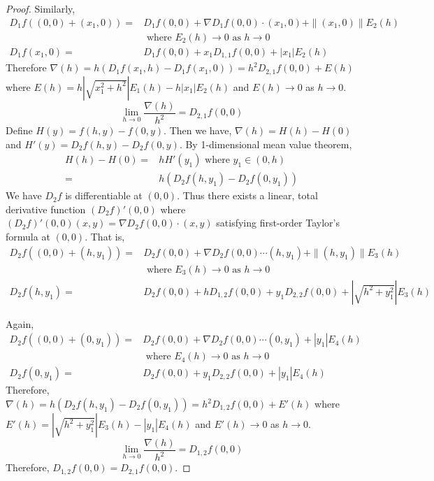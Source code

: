 \begin{proof}
	Similarly,
	\begin{align*}
		D_1 f((0,0) + (x_1,0)) = & D_1 f(0,0) + \nabla D_1 f(0,0) \cdot{} (x_1,0) + \|(x_1,0)\| E_2(h) \\
		& \text{ where } E_2(h) \to 0 \text{ as } h  \to 0 \\
		D_1 f(x_1,0) = & D_1 f(0,0) + x_1 D_{1,1} f(0,0) + |x_1| E_2(h)
	\end{align*}
	Therefore $\nabla(h) = h (D_1 f(x_1,h) - D_1 f(x_1,0)) = h^2 D_{2,1} f(0,0) + E(h)$ where $E(h) = h|\sqrt{x_1^2+h^2}| E_1(h) - h|x_1|E_2(h)$ and $E(h) \to 0$ as $h \to 0$.\\
	\begin{equation}
		\lim_{h \to 0} \frac{\nabla(h)}{h^2} = D_{2,1} f(0,0)
	\end{equation}
	Define $H(y) = f(h,y)-f(0,y)$. Then we have, $\nabla(h) = H(h)-H(0)$ and $H'(y) = D_2f(h,y) - D_2f(0,y)$. By 1-dimensional mean value theorem,
	\begin{align*}
		H(h)-H(0) = & hH'(y_1)  \text{ where } y_1 \in (0,h) \\
		= & h \left( D_2f(h,y_1)-D_2f(0,y_1) \right)
	\end{align*}
	We have $D_2 f$ is differentiable at $(0,0)$. Thus there exists a linear, total derivative function $(D_2f)'(0,0)$ where $(D_2f)'(0,0)(x,y) = \nabla D_2 f(0,0) \cdot{} (x,y)$ satisfying first-order Taylor's formula at $(0,0)$. That is,
	\begin{align*}
		D_2 f((0,0)+(h,y_1)) = & D_2 f(0,0) + \nabla D_2 f(0,0) \cdots{} (h,y_1) + \|(h,y_1)\| E_3(h) \\
		& \text{ where } E_3(h) \to 0 \text{ as } h \to 0 \\
		D_2 f(h,y_1) = & D_2 f(0,0) + h D_{1,2} f(0,0) + y_1 D_{2,2} f(0,0) + \left|\sqrt{h^2+y_1^2}\right| E_3(h)
	\end{align*}

	Again,
	\begin{align*}
		D_2 f((0,0)+(0,y_1)) = & D_2 f(0,0) + \nabla D_2 f(0,0) \cdots{} (0,y_1) + |y_1| E_4(h) \\
		& \text{ where } E_4(h) \to 0 \text{ as } h \to 0 \\
		D_2 f(0,y_1) = & D_2 f(0,0) + y_1 D_{2,2} f(0,0) + |y_1| E_4(h)
	\end{align*}
	Therefore, $\nabla(h) = h( D_2 f(h,y_1) - D_2 f(0,y_1) ) = h^2 D_{1,2} f(0,0) + E'(h)$ where $E'(h) = \left|\sqrt{h^2+y_1^2}\right| E_3(h) - |y_1|E_4(h)$ and $E'(h) \to 0$ as $h \to 0$.
	\begin{equation}
		\lim_{h \to 0} \frac{\nabla(h)}{h^2}  = D_{1,2} f(0,0)
	\end{equation}
	Therefore, $D_{1,2} f(0,0) = D_{2,1} f(0,0)$.
\end{proof}
